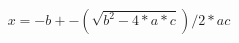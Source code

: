 \documentclass[preview]{standalone}
\begin{document}
\begin{align*}
x=-b+-(\sqrt{b^2-4*a*c})/2*ac
\end{align*}
\end{document}
